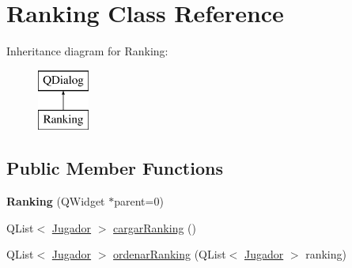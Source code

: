 \hypertarget{class_ranking}{\section{Ranking Class Reference}
\label{class_ranking}
}
Inheritance diagram for Ranking\-:\begin{figure}[H]
\begin{center}
\leavevmode
\includegraphics[height=2.000000cm]{class_ranking}
\end{center}
\end{figure}
\subsection*{Public Member Functions}
\begin{DoxyCompactItemize}
\item 
\hypertarget{class_ranking_a01f35fc321e4a359844411a3e4a20ba6}{{\bfseries Ranking} (Q\-Widget $\ast$parent=0)}\label{class_ranking_a01f35fc321e4a359844411a3e4a20ba6}

\item 
Q\-List$<$ \hyperlink{class_jugador}{Jugador} $>$ \hyperlink{class_ranking_a80088e847fbed9d724e03151da18d7b0}{cargar\-Ranking} ()
\item 
Q\-List$<$ \hyperlink{class_jugador}{Jugador} $>$ \hyperlink{class_ranking_a29e0de24fc7bd833d808e707b3979b3e}{ordenar\-Ranking} (Q\-List$<$ \hyperlink{class_jugador}{Jugador} $>$ ranking)
\end{DoxyCompactItemize}


